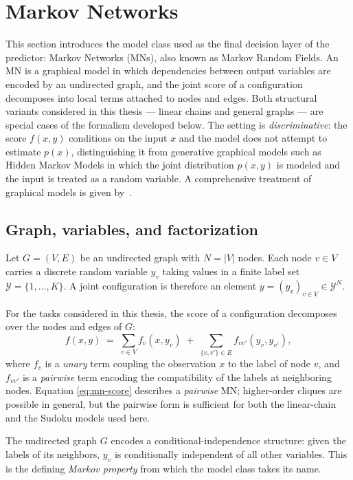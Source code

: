 \section{Markov Networks}
\label{sec:markov-networks}

This section introduces the model class used as the final decision
layer of the predictor: Markov Networks (MNs), also known as Markov
Random Fields. An MN is a graphical model in which dependencies
between output variables are encoded by an undirected graph, and the
joint score of a configuration decomposes into local terms attached
to nodes and edges. Both structural variants considered in this
thesis --- linear chains and general graphs --- are special cases of
the formalism developed below. The setting is \emph{discriminative}:
the score $f(x, y)$ conditions on the input $x$ and the model does
not attempt to estimate $p(x)$, distinguishing it from generative
graphical models such as Hidden Markov Models in which the joint
distribution $p(x, y)$ is modeled and the input is treated as a
random variable. A comprehensive treatment of graphical models is
given by~\cite{Koller2009}.

\subsection{Graph, variables, and factorization}

Let $G = (V, E)$ be an undirected graph with $N = |V|$ nodes. Each
node $v \in V$ carries a discrete random variable $y_v$ taking values
in a finite label set $\mathcal{Y} = \{1, \ldots, K\}$. A joint
configuration is therefore an element $y = (y_v)_{v \in V} \in
\mathcal{Y}^{N}$.

For the tasks considered in this thesis, the score of a configuration
decomposes over the nodes and edges of $G$:
\begin{equation}
    f(x, y) \;=\; \sum_{v \in V} f_v(x, y_v)
    \;+\; \sum_{\{v, v'\} \in E} f_{vv'}(y_v, y_{v'}),
    \label{eq:mn-score}
\end{equation}
where $f_v$ is a \emph{unary} term coupling the observation $x$ to the
label of node $v$, and $f_{vv'}$ is a \emph{pairwise} term encoding
the compatibility of the labels at neighboring nodes. Equation
\eqref{eq:mn-score} describes a \emph{pairwise} MN; higher-order
cliques are possible in general, but the pairwise form is sufficient
for both the linear-chain and the Sudoku models used here.

The undirected graph $G$ encodes a conditional-independence
structure: given the labels of its neighbors, $y_v$ is conditionally
independent of all other variables. This is the defining
\emph{Markov property} from which the model class takes its name.

